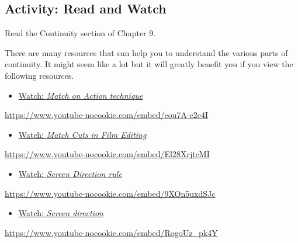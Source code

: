 \documentclass[
  letterpaper,
  DIV=11,
  numbers=noendperiod]{scrreprt}
\providecommand{\tightlist}{%
  \setlength{\itemsep}{0pt}\setlength{\parskip}{0pt}}\usepackage{longtable,booktabs,array}
\begin{document}
\subsection{Activity: Read and Watch}\label{activity-read-and-watch-1}

\begin{tcolorbox}[enhanced jigsaw, titlerule=0mm, opacitybacktitle=0.6, left=2mm, title={Learning Activity}, coltitle=black, colbacktitle=quarto-callout-note-color!10!white, toptitle=1mm, bottomtitle=1mm, colframe=quarto-callout-note-color-frame, colback=white, arc=.35mm, rightrule=.15mm, bottomrule=.15mm, toprule=.15mm, opacityback=0, breakable, leftrule=.75mm]

Read the Continuity section of Chapter 9.

There are many resources that can help you to understand the various
parts of continuity. It might seem like a lot but it will greatly
benefit you if you view the following resources.

\begin{itemize}
\tightlist
\item
  \href{https://www.youtube.com/watch?v=eou7A-e2e4I}{Watch: \emph{Match
  on Action technique}}
\end{itemize}

\url{https://www.youtube-nocookie.com/embed/eou7A-e2e4I}

\begin{itemize}
\tightlist
\item
  \href{https://www.youtube.com/watch?v=El28XrjtcMI}{Watch: \emph{Match
  Cuts in Film Editing}}
\end{itemize}

\url{https://www.youtube-nocookie.com/embed/El28XrjtcMI}

\begin{itemize}
\tightlist
\item
  \href{https://www.youtube.com/watch?v=9XOn5uxdSJc}{Watch: \emph{Screen
  Direction rule}}
\end{itemize}

\url{https://www.youtube-nocookie.com/embed/9XOn5uxdSJc}

\begin{itemize}
\tightlist
\item
  \href{https://www.youtube.com/watch?v=RogoUz_pk4Y}{Watch: \emph{Screen
  direction}}
\end{itemize}

\url{https://www.youtube-nocookie.com/embed/RogoUz_pk4Y}


\end{tcolorbox}
\end{document}
